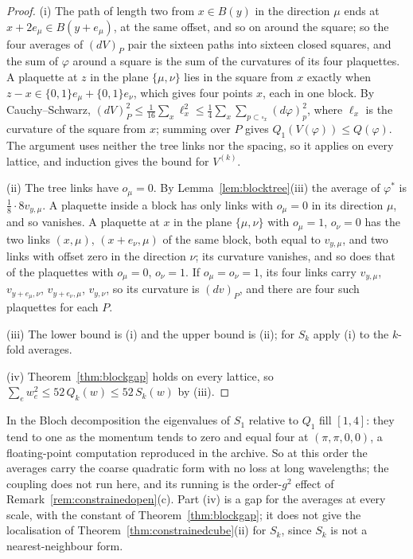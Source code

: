 \documentclass[11pt]{amsart}
\theoremstyle{definition}
\theoremstyle{remark}
\numberwithin{equation}{section}
\begin{document}
\begin{proof}
(i) The path of length two from $x\in B(y)$ in the direction $\mu$ ends at
$x+2e_\mu\in B(y+e_\mu)$, at the same offset, and so on around the square;
so the four averages of $(dV)_P$ pair the sixteen paths into sixteen closed
squares, and the sum of $\varphi$ around a square is the sum of the
curvatures of its four plaquettes. A plaquette at $z$ in the plane
$\{\mu,\nu\}$ lies in the square from $x$ exactly when $z-x\in\{0,1\}e_\mu+
\{0,1\}e_\nu$, which gives four points $x$, each in one block. By
Cauchy--Schwarz, $(dV)_P^2\le\frac1{16}\sum_x\ell_x^2\le\frac14\sum_x\sum_{p
\subset\square_x}(d\varphi)_p^2$, where $\ell_x$ is the curvature of the
square from $x$; summing over $P$ gives $Q_1(V(\varphi))\le Q(\varphi)$. The
argument uses neither the tree links nor the spacing, so it applies on every
lattice, and induction gives the bound for $V^{(k)}$.

(ii) The tree links have $o_\mu=0$. By Lemma~\ref{lem:blocktree}(iii) the
average of $\varphi^*$ is $\frac18\cdot8v_{y,\mu}$. A plaquette inside a block
has only links with $o_\mu=0$ in its direction $\mu$, and so vanishes. A
plaquette at $x$ in the plane $\{\mu,\nu\}$ with $o_\mu=1$, $o_\nu=0$ has the
two links $(x,\mu)$, $(x+e_\nu,\mu)$ of the same block, both equal to
$v_{y,\mu}$, and two links with offset zero in the direction $\nu$; its
curvature vanishes, and so does that of the plaquettes with $o_\mu=0$,
$o_\nu=1$. If $o_\mu=o_\nu=1$, its four links carry $v_{y,\mu}$,
$v_{y+e_\mu,\nu}$, $v_{y+e_\nu,\mu}$, $v_{y,\nu}$, so its curvature is
$(dv)_P$, and there are four such plaquettes for each $P$.

(iii) The lower bound is (i) and the upper bound is (ii); for $S_k$ apply
(i) to the $k$-fold averages.

(iv) Theorem~\ref{thm:blockgap} holds on every lattice, so $\sum_ew_e^2\le
52\,Q_k(w)\le52\,S_k(w)$ by (iii).
\end{proof}

In the Bloch decomposition the eigenvalues of $S_1$ relative to $Q_1$ fill
$[1,4]$: they tend to one as the momentum tends to zero and equal four at
$(\pi,\pi,0,0)$, a floating-point computation reproduced in the archive. So
at this order the averages carry the coarse quadratic form with no loss at
long wavelengths; the coupling does not run here, and its running is the
order-$g^2$ effect of Remark~\ref{rem:constrainedopen}(c). Part (iv) is a
gap for the averages at every scale, with the constant of
Theorem~\ref{thm:blockgap}; it does not give the localisation of
Theorem~\ref{thm:constrainedcube}(ii) for $S_k$, since $S_k$ is not a
nearest-neighbour form.
\end{document}
